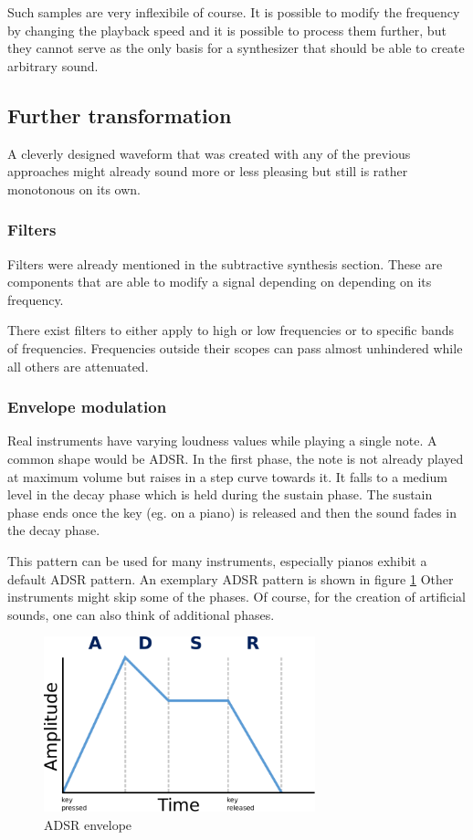 				Such samples are very inflexibile of course.
				It is possible to modify the frequency by changing the playback speed and it is possible to	process them further, but they cannot serve as the only basis for a synthesizer that should be able to create arbitrary sound.			
		\subsection{Further transformation}

			A cleverly designed waveform that was created with any of the previous approaches might already sound more or less pleasing but still is rather monotonous on its own.
			
			\subsubsection{Filters} 
				\label{subsec:filters}
				Filters were already mentioned in the subtractive synthesis section. 
				These are components that are able to modify a signal depending on depending on its frequency.
				
				There exist filters to either apply to high or low frequencies or to specific bands of frequencies.
				Frequencies outside their scopes can pass almost unhindered while all others are attenuated.
			\subsubsection{Envelope modulation}
				Real instruments have varying loudness values while playing a single note.
				A common shape would be	\ac{ADSR}.
				In the first phase, the note is not already played at maximum volume but raises in a step curve towards it.
				It falls to a medium level in the decay phase which is held during the sustain phase.
				The sustain phase ends once the key (eg. on a piano) is released and then the sound fades in the decay phase.
				
				This pattern can be used for many instruments, especially pianos exhibit a default \ac{ADSR} pattern. An exemplary ADSR pattern is shown in figure \ref{fig:adsr}
				Other instruments might skip some of the phases. 
				Of course, for the creation of artificial sounds, one can also think of additional phases.
				
				\begin{figure}[!h]
				\centering
					\includegraphics[width=0.70\textwidth]{images/adsr.pdf}
				\caption{\ac{ADSR} envelope}
				\label{fig:adsr}
				\end{figure}
				
